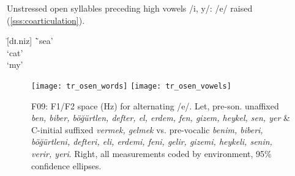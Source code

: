 \begin{example}\label{ex:trheightharmony}
Unstressed open syllables preceding high vowels /i, y/: /e/ raised (\cref{sss:coarticulation}).
  \begin{tabbing}
       \tab[2cm] \= [dɪ.niz] \tab[3cm] \=`sea' \\
       \> [kɪ.di] \>`cat' \\
       \> [bɪ.nim] \>`my'
  \end{tabbing}
\end{example}

\begin{figure}[H]
  \centering
  \texttt{[image: tr\_osen\_words]}\hfill
    \texttt{[image: tr\_osen\_vowels]}
  \caption[pre-sonorant {\it heykel, sen, biber \ldots} vs. affixed pre-vocalic {\it heykel-i, sen-in, biber-i \ldots}]{F09: F1/F2 space (Hz) for alternating /e/. Let, pre-son. unaffixed {\it b\textcolor{todo}{e}n, bib\textcolor{todo}{e}r, böğürtl\textcolor{todo}{e}n, deft\textcolor{todo}{e}r, \textcolor{todo}{e}l, erd\textcolor{todo}{e}m, f\textcolor{todo}{e}n, giz\textcolor{todo}{e}m, heyk\textcolor{todo}{e}l, s\textcolor{todo}{e}n, y\textcolor{todo}{e}r} \& C-initial suffixed {\it v\textcolor{link}{e}rmek, g\textcolor{link}{e}lmek} vs. pre-vocalic {\it b\textcolor{link}{e}nim, bib\textcolor{link}{e}ri, böğürtl\textcolor{link}{e}ni, deft\textcolor{link}{e}ri, \textcolor{link}{e}li, erd\textcolor{link}{e}mi, f\textcolor{link}{e}ni, g\textcolor{link}{e}lir, giz\textcolor{link}{e}mi, heyk\textcolor{link}{e}li, s\textcolor{link}{e}nin, v\textcolor{link}{e}rir, y\textcolor{link}{e}ri}. Right, all measurements coded by environment, 95\% confidence ellipses.}
  \label{fig:trwords}
\end{figure}

